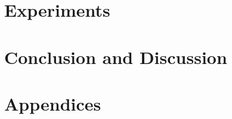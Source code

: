 \documentclass[twoside,11pt]{report}
\begin{document}
\part{Experiments}

    

\part{Conclusion and Discussion}

    

\part{Appendices}
\begin{appendices}
    
\end{appendices}

\clearpage

\printglossary
\clearpage


\printbibliography
\clearpage
\end{document}

